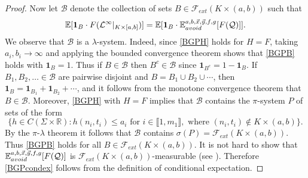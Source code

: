 \begin{proof}
	Now let $\mathcal{B}$ denote the collection of sets $B\in\mathcal{F}_{ext}(K\times(a,b))$ such that
	\begin{equation}\label{BGPB}
		\mathbb{E}[\mathbf{1}_B \cdot F(\mathcal{L}^\infty|_{K\times[a,b]})] = \mathbb{E}[\mathbf{1}_B \cdot \mathbb{E}^{a,b,\vec{x},\vec{y},f,g}_{avoid}[F(\mathcal{Q})]].
	\end{equation}
	We observe that $\mathcal{B}$ is a $\lambda$-system. Indeed, since \eqref{BGPH} holds for $H=F$, taking $a_i,b_i\to\infty$ and applying the bounded convergence theorem shows that \eqref{BGPB} holds with $\mathbf{1}_B = 1$. Thus if $B\in\mathcal{B}$ then $B^c\in\mathcal{B}$ since $\mathbf{1}_{B^c} = 1-\mathbf{1}_B$. If $B_1,B_2,\dots\in\mathcal{B}$ are pairwise disjoint and $B=B_1\cup B_2\cup\cdots$, then $\mathbf{1}_B = \mathbf{1}_{B_1} + \mathbf{1}_{B_2} + \cdots$, and it follows from the monotone convergence theorem that $B\in\mathcal{B}$. Moreover, \eqref{BGPH} with $H=F$ implies that $\mathcal{B}$ contains the $\pi$-system $P$ of sets of the form
	\[
	\{h\in C(\Sigma\times\mathbb{R}) : h(n_i,t_i) \leq a_i \mbox{ for } i \in\llbracket 1,m_1\rrbracket, \mbox{ where } (n_i,t_i)\notin K\times(a,b)\}.
	\]
	By the $\pi$-$\lambda$ theorem \cite[Theorem 2.1.6]{Durrett} it follows that $\mathcal{B}$ contains $\sigma(P) = \mathcal{F}_{ext}(K\times(a,b))$. Thus \eqref{BGPB} holds for all $B\in\mathcal{F}_{ext}(K\times(a,b))$. It is not hard to show that $\mathbb{E}^{a,b,\vec{x},\vec{y},f,g}_{avoid}[F(\mathcal{Q})]$ is $\mathcal{F}_{ext}(K\times(a,b))$-measurable (see \cite[Lemma 3.4]{DimMat}). Therefore \eqref{BGPcondex} follows from the definition of conditional expectation.
	
\end{proof}

